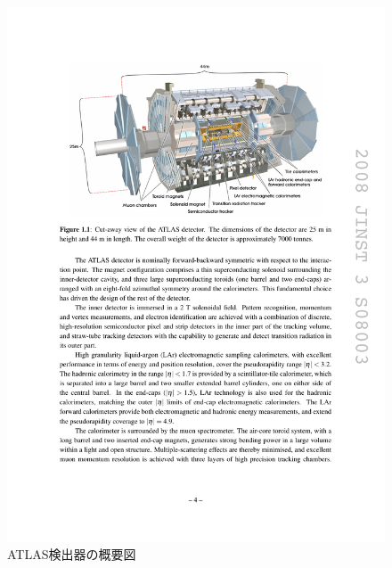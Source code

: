 \begin{figure} 
\centering
\includegraphics[width=16cm]{fig/Intro/ATLASdetector.pdf}
\caption[ATLAS検出器の概要]{ATLAS検出器の概要図\cite{JINST:2008}}
\label{ATLASdetector2}
\end{figure}

